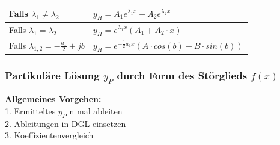 \begin{tabular}{|p{6cm}|p{8cm}|}
	\hline
	Falls $ \lambda_1\neq \lambda_2$&
	$y_H=A_1e^{\lambda_1x}+A_2e^{\lambda_2x}$\\
	\hline
	Falls $\lambda_1= \lambda_2$&
	$y_H=e^{\lambda_1x}(A_1+A_2\cdot x)$\\
	\hline
	Falls $\lambda_{1,2}= -\frac{a_1}{2} \pm jb$&
	$y_H=e^{-\frac{1}{2}a_1x}(A \cdot cos(b) +B \cdot sin(b))$\\
	\hline
\end{tabular}

\subsubsection{Partikuläre Lösung $y_P$ durch Form des Störglieds $f(x)$}
\textbf{Allgemeines Vorgehen:}\\
1. Ermitteltes $y_P$ n mal ableiten \\
2. Ableitungen in DGL einsetzen \\
3. Koeffizientenvergleich \\
\vspace{0.2cm}\\
